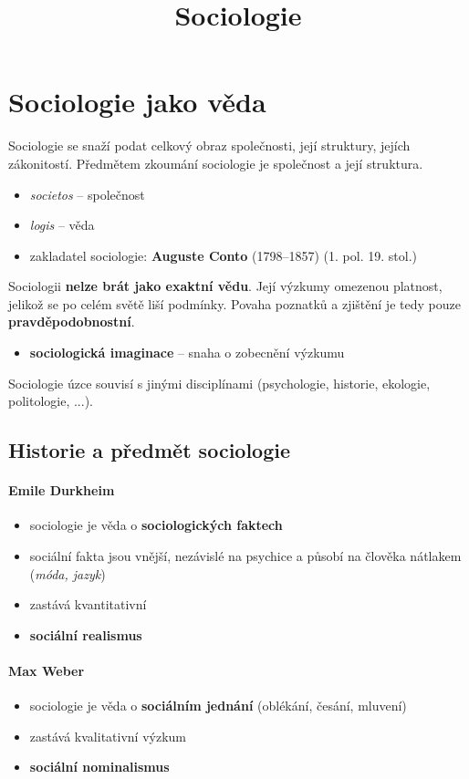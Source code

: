 \title{Sociologie}


\section{Sociologie jako věda}
Sociologie se snaží podat celkový obraz společnosti, její struktury, jejích zákonitostí. Předmětem zkoumání sociologie je společnost a její struktura.
\begin{itemize}
\item \textit{societos} -- společnost
\item \textit{logis} -- věda
\item zakladatel sociologie: \textbf{Auguste Conto} (1798--1857) (1. pol. 19. stol.)
\end{itemize}
Sociologii \textbf{nelze brát jako exaktní vědu}. Její výzkumy omezenou platnost, jelikož se po celém světě liší podmínky. Povaha poznatků a zjištění je tedy pouze \textbf{pravděpodobnostní}.
\begin{itemize}
\item \textbf{sociologická imaginace} -- snaha o zobecnění výzkumu
\end{itemize}
Sociologie úzce souvisí s jinými disciplínami (psychologie, historie, ekologie, politologie, ...).\\



\subsection{Historie a předmět sociologie}
\paragraph{Emile Durkheim}
\begin{itemize}
\item sociologie je věda o \textbf{sociologických faktech}
\item sociální fakta jsou vnější, nezávislé na psychice a působí na člověka nátlakem (\textit{móda, jazyk})
\item zastává kvantitativní
\item \textbf{sociální realismus}
\end{itemize}

\paragraph{Max Weber}
\begin{itemize}
\item sociologie je věda o \textbf{sociálním jednání} (oblékání, česání, mluvení)
\item zastává kvalitativní výzkum
\item \textbf{sociální nominalismus}
\end{itemize}

